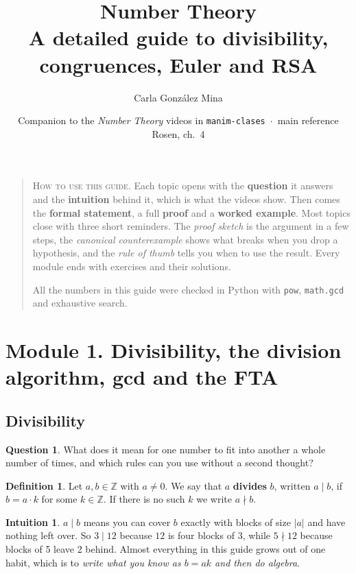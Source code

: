 \documentclass[11pt,a4paper]{article}
\title{\textbf{Number Theory}\\[2pt]\large A detailed guide to divisibility, congruences, Euler and RSA}
\author{Carla González Mina}
\date{Companion to the \emph{Number Theory} videos in \texttt{manim-clases} \,$\cdot$\, main reference Rosen, ch.~4}
\theoremstyle{definition}
\newtheorem{definition}[theorem]{Definition}
\newcommand{\Z}{\mathbb{Z}}
\theoremstyle{noteit}
\newtheorem*{question}{Question}
\theoremstyle{note}
\newtheorem*{intuition}{Intuition}
\begin{document}
\maketitle

\begin{quotation}\small
\noindent\textsc{How to use this guide.}\enspace
Each topic opens with the \textbf{question} it answers and the \textbf{intuition} behind it, which is what the videos show. Then comes the \textbf{formal statement}, a full \textbf{proof} and a \textbf{worked example}. Most topics close with three short reminders. The \emph{proof sketch} is the argument in a few steps, the \emph{canonical counterexample} shows what breaks when you drop a hypothesis, and the \emph{rule of thumb} tells you when to use the result. Every module ends with exercises and their solutions.

All the numbers in this guide were checked in Python with \texttt{pow}, \texttt{math.gcd} and exhaustive search.
\end{quotation}

\tableofcontents
\newpage

\section{Module 1. Divisibility, the division algorithm, gcd and the FTA}

\subsection{Divisibility}

\begin{question}
What does it mean for one number to fit into another a whole number of times, and which rules can you use without a second thought?
\end{question}

\begin{definition}
Let $a,b\in\Z$ with $a\neq 0$. We say that $a$ \textbf{divides} $b$, written $a\mid b$, if $b=a\cdot k$ for some $k\in\Z$. If there is no such $k$ we write $a\nmid b$.
\end{definition}

\begin{intuition}
$a\mid b$ means you can cover $b$ exactly with blocks of size $|a|$ and have nothing left over. So $3\mid 12$ because $12$ is four blocks of $3$, while $5\nmid 12$ because blocks of 5 leave 2 behind. Almost everything in this guide grows out of one habit, which is to \emph{write what you know as $b=ak$ and then do algebra}.
\end{intuition}
\end{document}
